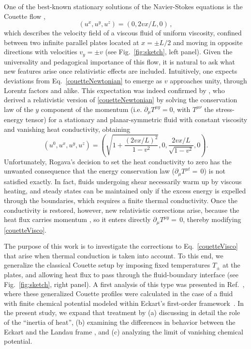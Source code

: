 \documentclass[a4paper, amsfonts, amssymb, amsmath, reprint, showkeys, nofootinbib, twoside,notitlepage,onecolumn]{revtex4-1}
\theoremstyle{definition}
\theoremstyle{theorem}
\begin{document}
One of the best-known stationary solutions of the Navier-Stokes equations is the Couette flow \cite{SchlichtingBoundaryLayerBook2017},
\begin{equation}\label{couetteNewtonian}
(u^x, u^y, u^z) = (0, 2vx/L, 0)\,,
\end{equation}
which describes the velocity field of a viscous fluid of uniform viscosity, confined between two infinite parallel plates located at $x = \pm L/2$ and moving in opposite directions with velocities $v_y = \pm v$ (see Fig.~\ref{fig:sketch}, left panel). Given the universality and pedagogical importance of this flow, it is natural to ask what new features arise once relativistic effects are included. Intuitively, one expects deviations from Eq.~\eqref{couetteNewtonian} to emerge as $v$ approaches unity, through Lorentz factors and alike. This expectation was indeed confirmed by \citet{Rogava1996}, who derived a relativistic version of \eqref{couetteNewtonian} by solving the conservation law of the $y$ component of the momentum (i.e.
$\partial_\mu T^{\mu y} = 0$, with $T^{\mu \nu}$ the stress-energy tensor)
for a stationary and planar-symmetric fluid with constant viscosity and vanishing heat conductivity, obtaining
\begin{equation}\label{couetteVisco}
(u^0, u^x, u^y, u^z)
= \left(
\sqrt{1 + \frac{(2vx/L)^2}{1 - v^2}},
0,
\frac{2vx/L}{\sqrt{1 - v^2}},
0
\right) .
\end{equation}
Unfortunately, Rogava's decision to set the heat conductivity to zero has the unwanted consequence that the energy conservation law ($\partial_\mu T^{\mu t}{=}\,0$) is not satisfied exactly. In fact, fluids undergoing shear necessarily warm up by viscous heating, and steady states can be maintained only if the excess energy is expelled through the boundaries, which requires a finite thermal conductivity. Once the conductivity is restored, however, new relativistic corrections arise, because the heat flux carries momentum \cite[\S 5.7]{MTW_book}, so it enters directly $\partial_\mu T^{\mu y}{=}\,0$, thereby modifying \eqref{couetteVisco}.

\newpage

The purpose of this work is to investigate the corrections to Eq.~\eqref{couetteVisco} that arise when thermal conduction is taken into account. To this end, we generalize the classical Couette setup by imposing fixed temperatures $T_{\pm}$ at the plates, and allowing heat flux to pass through the fluid-boundary interface (see Fig.~\ref{fig:sketch}, right panel). A first analysis of this type was presented in Ref.~\cite{Granik1996}, where these generalized Couette profiles were calculated in the case of a fluid with finite chemical potential modeled within Eckart’s first-order framework~\cite{Eckart40}. In the present study, we expand that treatment by (a) discussing in detail the role of the ``inertia of heat'', (b) examining the differences in behavior between the Eckart and the Landau frame \cite{landau6,OlsonLifsh1990}, and (c) analyzing the limit of vanishing chemical potential.
\end{document}
